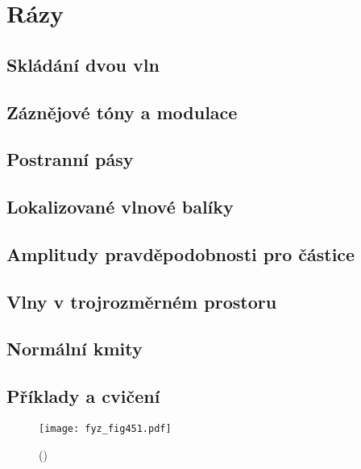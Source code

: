 \setchaptertoc
\chapter{Rázy}\label{fyz:IchapXLVIII}

  \section{Skládání dvou vln}\label{fyz:IchapXLVIIIsecI}
  \section{Záznějové tóny a modulace}\label{fyz:IchapXLVIIIsecII}
  \section{Postranní pásy}\label{fyz:IchapXLVIIIsecIII}
  \section{Lokalizované vlnové balíky}\label{fyz:IchapXLVIIIsecIV}
  \section{Amplitudy pravděpodobnosti pro částice}\label{fyz:IchapXLVIIIsecV}
  \section{Vlny v trojrozměrném prostoru}\label{fyz:IchapXLVIIIsecVI}
  \section{Normální kmity}\label{fyz:IchapXLVIIIsecVII}
  \section{Příklady a cvičení}\label{fyz:IchapXLVIIIsecVIII}

    \begin{figure}[ht!] %
      \centering
      \texttt{[image: fyz\_fig451.pdf]}
      \caption{ 
               (\cite[s.~707]{Feynman01})}
      \label{fyz:fig451}
    \end{figure}
    
